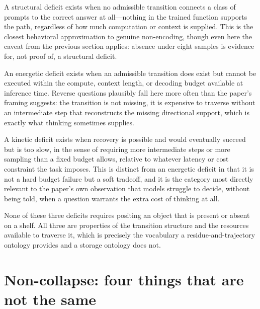 \documentclass[11pt]{article}
\begin{document}
A structural deficit exists when no admissible transition connects a class of prompts to the correct answer at all---nothing in the trained function supports the path, regardless of how much computation or context is supplied. This is the closest behavioral approximation to genuine non-encoding, though even here the caveat from the previous section applies: absence under eight samples is evidence for, not proof of, a structural deficit.

An energetic deficit exists when an admissible transition does exist but cannot be executed within the compute, context length, or decoding budget available at inference time. Reverse questions plausibly fall here more often than the paper's framing suggests: the transition is not missing, it is expensive to traverse without an intermediate step that reconstructs the missing directional support, which is exactly what thinking sometimes supplies.

A kinetic deficit exists when recovery is possible and would eventually succeed but is too slow, in the sense of requiring more intermediate steps or more sampling than a fixed budget allows, relative to whatever latency or cost constraint the task imposes. This is distinct from an energetic deficit in that it is not a hard budget failure but a soft tradeoff, and it is the category most directly relevant to the paper's own observation that models struggle to decide, without being told, when a question warrants the extra cost of thinking at all.

None of these three deficits requires positing an object that is present or absent on a shelf. All three are properties of the transition structure and the resources available to traverse it, which is precisely the vocabulary a residue-and-trajectory ontology provides and a storage ontology does not.

\section{Non-collapse: four things that are not the same}
\end{document}
